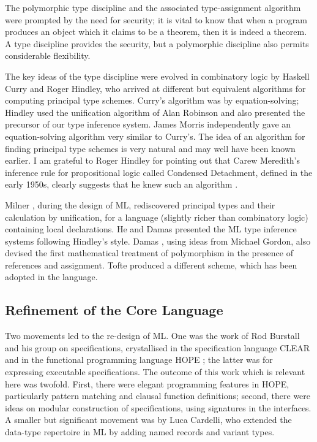 The polymorphic type discipline and the associated type-assignment algorithm
were prompted by the need for security;  it is vital to know that when
a program produces an object which it claims to be a theorem, then it
is indeed a theorem.  A type discipline provides the security, but a
polymorphic discipline also permits considerable flexibility.

The key ideas of the type discipline were evolved in
combinatory logic by Haskell Curry and Roger Hindley, who arrived at
different but equivalent algorithms for computing principal type schemes.
Curry's \cite{Cur} algorithm was by equation-solving; Hindley \cite{Hin} used
the unification algorithm of Alan Robinson \cite{Rob} and  also presented the 
precursor of our type inference system.
James Morris \cite{Mor} independently gave an equation-solving algorithm very
similar to Curry's.  The idea of an algorithm for finding principal 
type schemes is very natural and may well have been known earlier. I am
grateful to Roger Hindley for pointing out that Carew Meredith's inference 
rule for propositional logic called Condensed Detachment, defined
in the early 1950s, clearly suggests that he knew such an algorithm \cite{Mer}. 

Milner \cite{Mil1}, during the design of ML,
rediscovered principal types and their calculation by unification, for a
language (slightly richer than combinatory logic) containing local
declarations.  He and Damas \cite{DM} presented the ML type inference systems
following Hindley's style.
Damas \cite{Dam}, using ideas from Michael Gordon, also devised the first
mathematical treatment of polymorphism in the presence of references and
assignment.  Tofte \cite{Tof-a} produced a different scheme, which
has been adopted in the language.

\subsection*{Refinement of the Core Language}

Two movements led to the re-design of ML.  One was the work of Rod
Burstall and his group on specifications, crystallised in the specification
language CLEAR \cite{BG} and in the functional programming language HOPE
\cite{BMS};  the latter was for expressing executable specifications.  The
outcome of this work which is relevant here was twofold.  First, there were
elegant programming features in HOPE, particularly pattern matching
and clausal function definitions;  second, there were ideas on modular
construction of specifications, using signatures in the 
interfaces.  A smaller but significant movement was by Luca Cardelli,
who extended the data-type repertoire in ML by adding named records and
variant types.

